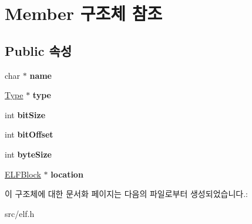 \hypertarget{struct_member}{}\section{Member 구조체 참조}
\label{struct_member}
\subsection*{Public 속성}
\begin{DoxyCompactItemize}
\item 
\mbox{\label{struct_member_ac8be1720085e46e70c678c5885837ccb}} 
char $\ast$ {\bfseries name}
\item 
\mbox{\label{struct_member_a7161459617d2ec472eb3830235c18d32}} 
\mbox{\hyperlink{struct_type}{Type}} $\ast$ {\bfseries type}
\item 
\mbox{\label{struct_member_a8bf551a2d4b44b5f83737444c90e15aa}} 
int {\bfseries bit\+Size}
\item 
\mbox{\label{struct_member_a7c79fe4b6825fbbb5135651ddfb9ae8f}} 
int {\bfseries bit\+Offset}
\item 
\mbox{\label{struct_member_a4c713b726b98ec770e1139b672899ef4}} 
int {\bfseries byte\+Size}
\item 
\mbox{\label{struct_member_adceaf807e8862e3464a63dacfd1d7fb3}} 
\mbox{\hyperlink{struct_e_l_f_block}{E\+L\+F\+Block}} $\ast$ {\bfseries location}
\end{DoxyCompactItemize}


이 구조체에 대한 문서화 페이지는 다음의 파일로부터 생성되었습니다.\+:\begin{DoxyCompactItemize}
\item 
src/elf.\+h\end{DoxyCompactItemize}
